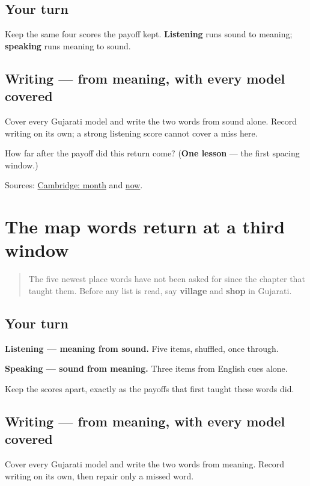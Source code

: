 \subsection*{Your turn}
Keep the same four scores the payoff kept. \textbf{Listening} runs sound to meaning; \textbf{speaking} runs meaning to sound.

\subsection*{Writing — from meaning, with every model covered}
Cover every Gujarati model and write the two words from sound alone. Record writing on its own; a strong listening score cannot cover a miss here.

\begin{tcolorbox}[breakable,colback=teal!4,colframe=teal!35!black,title={Before you move on}]
How far after the payoff did this return come? (\textbf{One lesson} — the first spacing window.)

Sources: \href{https://dictionary.cambridge.org/dictionary/english-gujarati/month}{Cambridge: month} and \href{https://dictionary.cambridge.org/dictionary/english-gujarati/now}{now}.
\end{tcolorbox}
\section[Practice]{The map words return at a third window}

\label{lesson:GU-R24-map-ten-r3}



\begin{quote}
The five newest place words have not been asked for since the chapter that taught them. Before any list is read, say \textbf{village} and \textbf{shop} in Gujarati.
\end{quote}

\subsection*{Your turn}
\textbf{Listening — meaning from sound.} Five items, shuffled, once through.

\textbf{Speaking — sound from meaning.} Three items from English cues alone.

Keep the scores apart, exactly as the payoffs that first taught these words did.

\subsection*{Writing — from meaning, with every model covered}
Cover every Gujarati model and write the two words from meaning. Record writing on its own, then repair only a missed word.

